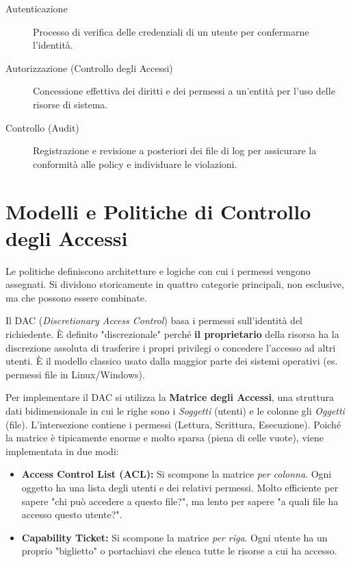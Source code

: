 \begin{description}
    \item[Autenticazione] Processo di verifica delle credenziali di un utente per confermarne l'identità.
    \item[Autorizzazione (Controllo degli Accessi)] Concessione effettiva dei diritti e dei permessi a un'entità per l'uso delle risorse di sistema.
    \item[Controllo (Audit)] Registrazione e revisione a posteriori dei file di log per assicurare la conformità alle policy e individuare le violazioni.
\end{description}


\section{Modelli e Politiche di Controllo degli Accessi}

Le politiche definiscono architetture e logiche con cui i permessi vengono assegnati. Si dividono storicamente in quattro categorie principali, non esclusive, ma che possono essere combinate.

\begin{defbox}
Il DAC (\textit{Discretionary Access Control}) basa i permessi sull'identità del richiedente. È definito "discrezionale" perché \textbf{il proprietario} della risorsa ha la discrezione assoluta di trasferire i propri privilegi o concedere l'accesso ad altri utenti. È il modello classico usato dalla maggior parte dei sistemi operativi (es. permessi file in Linux/Windows).
\end{defbox}

Per implementare il DAC si utilizza la \textbf{Matrice degli Accessi}, una struttura dati bidimensionale in cui le righe sono i \textit{Soggetti} (utenti) e le colonne gli \textit{Oggetti} (file). L'intersezione contiene i permessi (Lettura, Scrittura, Esecuzione).
Poiché la matrice è tipicamente enorme e molto sparsa (piena di celle vuote), viene implementata in due modi:
\begin{itemize}
    \item \textbf{Access Control List (ACL):} Si scompone la matrice \textit{per colonna}. Ogni oggetto ha una lista degli utenti e dei relativi permessi. Molto efficiente per sapere "chi può accedere a questo file?", ma lento per sapere "a quali file ha accesso questo utente?".
    \item \textbf{Capability Ticket:} Si scompone la matrice \textit{per riga}. Ogni utente ha un proprio "biglietto" o portachiavi che elenca tutte le risorse a cui ha accesso.
\end{itemize}

